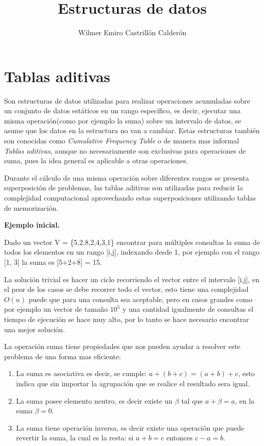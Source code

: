 \documentclass[12pt, a4paper]{article}
\title{\textbf{Estructuras de datos}}
\author{Wilmer Emiro Castrillón Calderón}
\newcommand{\subtitulo}[1]{\begin{center}\textbf{#1}\end{center}}
\begin{document}
	\maketitle
	
	\section{Tablas aditivas}
	Son estructuras de datos utilizadas para realizar operaciones acumuladas sobre un conjunto de datos estáticos
	en un rango específico, es decir, ejecutar una misma operación(como por ejemplo la suma) sobre un intervalo
	de datos, se asume que los datos en la estructura no van a cambiar. Estas estructuras también son conocidas como
	\textit{Cumulative Frequency Table} o de manera mas informal \textit{Tablas aditivas}, aunque no necesariamente 
	son exclusivas para operaciones de suma, pues la idea general es aplicable a otras operaciones.
	
	Durante el cálculo de una misma operación sobre diferentes rangos se presenta superposición de problemas, las 
	tablas aditivas son utilizadas para reducir la complejidad computacional aprovechando estas superposiciones
	utilizando tablas de memorización.	
	
	\subtitulo{Ejemplo inicial.}
	
	Dado un vector V = \{5,2,8,2,4,3,1\} encontrar para múltiples consultas la suma de todos los elementos en un rango
	[i,j], indexando desde 1, por ejemplo con el rango [1, 3] la suma es [5+2+8] = 15.
	
	La solución trivial es hacer un ciclo recorriendo el vector entre el intervalo [i,j], en el peor de los casos se
	debe recorrer todo el vector, esto tiene una complejidad $O(n)$ puede que para una consulta sea aceptable, pero
	en casos grandes como por ejemplo un vector de tamaño $10^{5}$ y una cantidad igualmente de consultas el tiempo 
	de ejecución se hace muy alto, por lo tanto se hace necesario encontrar una mejor solución.	
	
	La operación suma tiene propiedades que nos pueden ayudar a resolver este problema de una forma mas eficiente:
	\begin{enumerate}[1.]
		\item La suma es asociativa es decir, se cumple: $a+(b+c)=(a+b)+c$, esto indica que sin importar 
			la agrupación que se realice el resultado sera igual.
		\item La suma posee elemento neutro, es decir existe un $\beta$ tal que $a + \beta = a$, en la suma 
			$\beta = 0$.
		\item La suma tiene operación inversa, es decir existe una operación que puede revertir la suma, la cual 
			es la resta: si $a+b=c$ entonces $c-a=b$.
	\end{enumerate}
	
\end{document}
